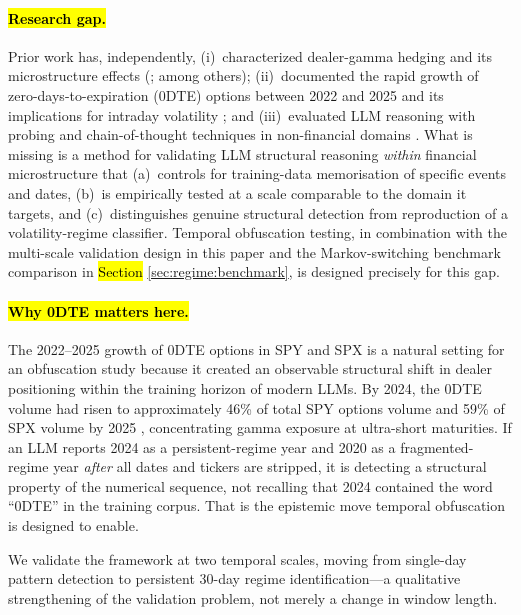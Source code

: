 \documentclass[jrfm,article,accept,moreauthors,pdftex]{Definitions/mdpi}
\begin{document}
\paragraph{\hl{Research gap.}}%
Prior work has, independently, (i)~characterized dealer-gamma hedging and its microstructure effects (\citealp{ni2005stock,garleanu2009demand,anderegg2022impact,dim2023odtes,adams2025zerodte}; among others); (ii)~documented the rapid growth of zero-days-to-expiration (0DTE) options between 2022 and 2025 and its implications for intraday volatility \citep{cboe2024zero,cboe2025spx0dte,fishman2023gamma}; and (iii)~evaluated LLM reasoning with probing and chain-of-thought techniques in non-financial domains \citep{wei2022chain,kojima2022large,mccoy2023embers}. What is missing is a method for validating LLM structural reasoning \emph{within} financial microstructure that (a)~controls for training-data memorisation of specific events and dates, (b)~is empirically tested at a scale comparable to the domain it targets, and (c)~distinguishes genuine structural detection from reproduction of a volatility-regime classifier. Temporal obfuscation testing, in combination with the multi-scale validation design in this paper and the Markov-switching benchmark comparison in \hl{Section} %
 \ref{sec:regime:benchmark}, is designed precisely for this gap.

\paragraph{\hl{Why 0DTE matters here.}}
The 2022--2025 growth of 0DTE options in SPY and SPX is a natural setting for an obfuscation study because it created an observable structural shift in dealer positioning within the training horizon of modern LLMs. By 2024, the 0DTE volume had risen to approximately 46\% of total SPY options volume and 59\% of SPX volume by 2025 \citep{cboe2024zero,cboe2025spx0dte,dim2023odtes,adams2025zerodte}, concentrating gamma exposure at ultra-short maturities. If an LLM reports 2024 as a persistent-regime year and 2020 as a fragmented-regime year \emph{after} all dates and tickers are stripped, it is detecting a structural property of the numerical sequence, not recalling that 2024 contained the word ``0DTE'' in the training corpus. That is the epistemic move temporal obfuscation is designed to enable.

We validate the framework at two temporal scales, moving from single-day pattern detection to persistent 30-day regime identification---a qualitative strengthening of the validation problem, not merely a change in window length.
\end{document}
